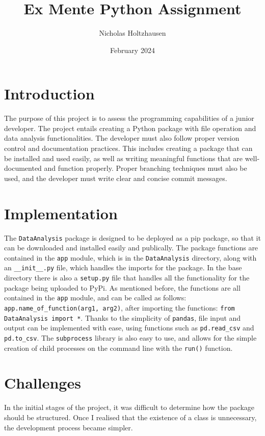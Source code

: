 \documentclass[12pt]{article}
\title{Ex Mente Python Assignment}
\author{Nicholas Holtzhausen}
\date{February 2024}
\begin{document}
\maketitle

\section{Introduction}
The purpose of this project is to assess the programming capabilities of a
junior developer. The project entails creating a Python package with file
operation and data analysis functionalities. The developer must also follow
proper version control and documentation practices. This includes creating a
package that can be installed and used easily, as well as writing meaningful
functions that are well-documented and function properly. Proper branching
techniques must also be used, and the developer must write clear and concise
commit messages.

\section{Implementation}
The \verb|DataAnalysis| package is designed to be deployed as a pip package, so
that it can be downloaded and installed easily and publically. The package
functions are contained in the \verb|app| module, which is in the
\verb|DataAnalysis| directory, along with an \verb|__init__.py| file, which
handles the imports for the package. In the base directory there is also a
\verb|setup.py| file that handles all the functionality for the package being
uploaded to PyPi.\newline\newline
As mentioned before, the functions are all contained in the \verb|app| module,
and can be called as follows: \verb|app.name_of_function(arg1, arg2)|, after
importing the functions: \verb|from DataAnalysis import *|.\newline\newline
Thanks to the simplicity of \verb|pandas|, file input and output can be
implemented with ease, using functions such as \verb|pd.read_csv| and
\verb|pd.to_csv|. The \verb|subprocess| library is also easy to use, and allows
for the simple creation of child processes on the command line with the
\verb|run()| function.

\section{Challenges}
In the initial stages of the project, it was difficult to determine how the
package should be structured. Once I realised that the existence of a class is
unnecessary, the development process became simpler.
\end{document}
